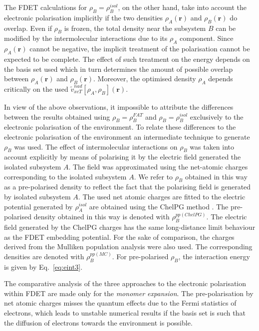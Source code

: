 \documentclass[amsmath,amssymb,preprint,aip,jcp]{revtex4-1}
\begin{document}
The FDET calculations for $\rho_B=\rho_B^{isol}$, on the other hand, take into account the electronic polarisation implicitly if the two densities $\rho_A(\mathbf{r})$ and $\rho_B(\mathbf{r})$ do overlap. 
Even if $\rho_B$ is frozen, the total density near the subsystem $B$ can be modified by the intermolecular interactions due to its $\rho_A$ component. Since $\rho_A(\mathbf{r})$ cannot be negative, the implicit treatment of the polarisation cannot be expected to be complete. 
The effect of such treatment on the energy depends on the basis set used which in turn determines the amount of possible overlap between $\rho_A(\mathbf{r})$ and $\rho_B(\mathbf{r})$.
Moreover, the optimised density 
$\rho_A$ depends critically on the used $\tilde{v}_{xcT}^{nad}[\rho_A,\rho_B](\mathbf{r})$. 

In view of the above observations, it impossible to attribute the differences between the results obtained using $\rho_B=\rho_B^{FAT}$ and $\rho_B=\rho_B^{isol}$ exclusively to the electronic polarisation of the environment.
To relate these differences to the electronic polarisation of the environment an intermediate technique to generate 
 $\rho_B$ was used.
The effect of intermolecular interactions on 
$\rho_B$ was taken into account explicitly
 by means of polarising it by the electric field generated the isolated subsystem $A$. 
The field was approximated using the net-atomic charges corresponding to the isolated subsystem $A$. 
We refer to $\rho_B$ obtained in this way as a pre-polarised density to reflect the fact that the polarising field is generated by isolated subsystem $A$.
The used net atomic charges are fitted to the electric potential generated by $\rho_A^{isol}$ are obtained using the ChelPG method \cite{Breneman1990}.
The pre-polarised density obtained in this way is denoted with $\rho_B^{pp(ChelPG)}$.
The electric field generated by the ChelPG charges has the same long-distance limit behaviour as the FDET embedding potential.
For the sake of comparison, the charges derived from the Mulliken population analysis \cite{Mulliken1955} were also used.
The corresponding densities are denoted with $\rho_B^{pp(MC)}$. 
For pre-polarised $\rho_B$, the interaction energy is given by Eq.~\ref{eq:eint3}.

The comparative analysis of the three approaches to the electronic polarisation within FDET
are made only for the {\it monomer expansion}. The pre-polarisation by net atomic charges misses the quantum effects due to the Fermi statistics of electrons, which leads to unstable numerical results if the basis set is such that the diffusion of electrons towards the environment is possible.\cite{Fradelos2011a,Fradelos2011c}
\end{document}
